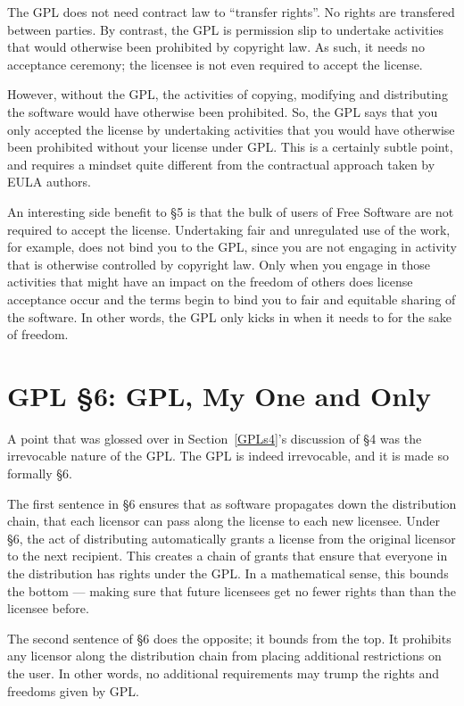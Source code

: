 \documentclass[12pt]{report}
\begin{document}
The GPL does not need contract law to ``transfer rights''.  No rights are
transfered between parties.  By contrast, the GPL is permission slip to
undertake activities that would otherwise been prohibited by copyright law.
As such, it needs no acceptance ceremony; the licensee is not even
required to accept the license.

However, without the GPL, the activities of copying, modifying and
distributing the software would have otherwise been prohibited.  So, the
GPL says that you only accepted the license by undertaking activities that
you would have otherwise been prohibited without your license under GPL\@.
This is a certainly subtle point, and requires a mindset quite different
from the contractual approach taken by EULA authors.

An interesting side benefit to \S 5 is that the bulk of users of Free
Software are not required to accept the license.  Undertaking fair and
unregulated use of the work, for example, does not bind you to the GPL,
since you are not engaging in activity that is otherwise controlled by
copyright law.  Only when you engage in those activities that might have an
impact on the freedom of others does license acceptance occur and the
terms begin to bind you to fair and equitable sharing of the software.  In
other words, the GPL only kicks in when it needs to for the sake of
freedom.

\section{GPL \S 6: GPL, My One and Only}
\label{GPLs6}

A point that was glossed over in Section~\ref{GPLs4}'s discussion of \S 4
was the irrevocable nature of the GPL\@.  The GPL is indeed irrevocable,
and it is made so formally \S 6.

The first sentence in \S 6 ensures that as software propagates down the
distribution chain, that each licensor can pass along the license to each
new licensee.  Under \S 6, the act of distributing automatically grants a
license from the original licensor to the next recipient.  This creates a
chain of grants that ensure that everyone in the distribution has rights
under the GPL\@.  In a mathematical sense, this bounds the bottom ---
making sure that future licensees get no fewer rights than than the
licensee before.

The second sentence of \S 6 does the opposite; it bounds from the top.  It
prohibits any licensor along the distribution chain from placing
additional restrictions on the user.  In other words, no additional
requirements may trump the rights and freedoms given by GPL\@.
\end{document}
